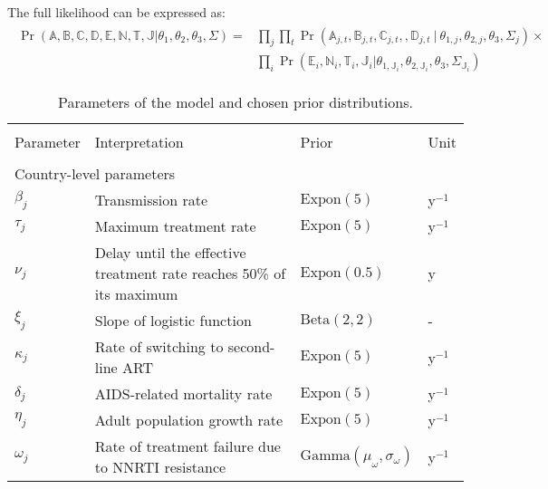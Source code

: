 \documentclass{article}
\begin{document}
	The full likelihood can be expressed as:
	\begin{align}
	\begin{split}
	\Pr(\mathds{A},\mathds{B},\mathds{C},\mathds{D},\mathds{E},\mathds{N},\mathds{T},\mathds{J} |  \theta_{1},\theta_{2},\theta_3,\Sigma) = &\prod_{j} \prod_t  \Pr(
	\mathds{A}_{j,t},\mathds{B}_{j,t},\mathds{C}_{j,t},,\mathds{D}_{j,t} \ | \ \theta_{1,j},\theta_{2,j},\theta_3,\Sigma_j )
	\times \\
	&\prod_i \Pr(\mathds{E}_i,\mathds{N}_i,\mathds{T}_i,\mathds{J}_i | \theta_{1,\mathds{J}_i},\theta_{2,\mathds{J}_i},\theta_3,\Sigma_{\mathds{J}_i})
	\end{split} 
	\end{align}
	
	
	\begin{table}[H]
		\centering
		\caption{Parameters of the model and chosen prior distributions.}
		\label{table:priors2}
		\begin{tabular}{lp{9.5cm}p{2.9cm}l}
			\hline \\[-.8em]
			Parameter & Interpretation & Prior & Unit \\
			\hline \\[-.8em]
			\multicolumn{4}{l}{{Country-level parameters}} \\[.2em]
			\hspace{.8em}$\beta_j$ & Transmission rate & $\text{Expon}(5)$ & y$^{-1}$\\ 
			\hspace{.8em}$\tau_j$ & Maximum treatment rate & $\text{Expon}(5)$ & y$^{-1}$ \\ 
			\hspace{.8em}$\nu_j$ & Delay until the effective treatment rate reaches 50\% of its maximum & $\text{Expon}(0.5)$& y  \\ 
			\hspace{.8em}$\xi_j$ & Slope of logistic function & $\text{Beta}(2,2)$ & -\\ 
			\hspace{.8em}$\kappa_j$ & Rate of switching to second-line ART &  $\text{Expon}(5)$ & y$^{-1}$\\
			\hspace{.8em}$\delta_j$ & AIDS-related mortality rate &$\text{Expon}(5)$& y$^{-1}$ \\ 
			\hspace{.8em}$\eta_j$ & Adult population growth rate & $\text{Expon}(5)$ & y$^{-1}$\\ 
			\hspace{.8em}$\omega_j$ & Rate of treatment failure due to NNRTI resistance & $\text{Gamma}(\mu_{\omega},\sigma_{\omega})$ & y$^{-1}$\\ 

\end{tabular}
\end{table}
\end{document}
